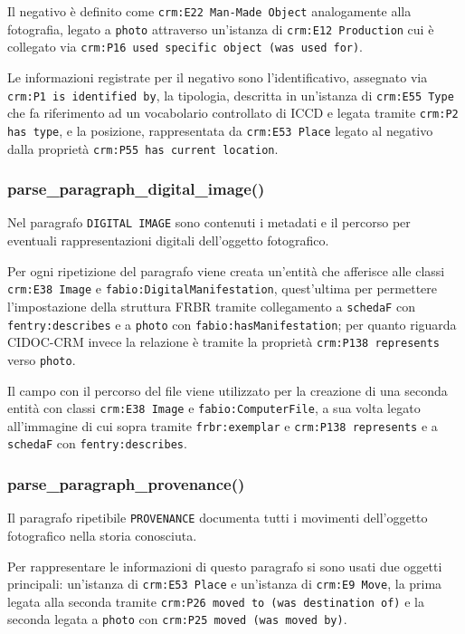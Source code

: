Il negativo è definito come \texttt{crm:E22 Man-Made Object} analogamente alla fotografia, legato a \texttt{photo} attraverso un'istanza di \texttt{crm:E12 Production} cui è collegato via \texttt{crm:P16 used specific object (was used for)}.

Le informazioni registrate per il negativo sono l'identificativo, assegnato via \texttt{crm:P1 is identified by}, la tipologia, descritta in un'istanza di \texttt{crm:E55 Type} che fa riferimento ad un vocabolario controllato di ICCD e legata tramite \texttt{crm:P2 has type}, e la posizione, rappresentata da \texttt{crm:E53 Place} legato al negativo dalla proprietà \texttt{crm:P55 has current location}.

\subsubsection{parse\_paragraph\_digital\_image()}
Nel paragrafo \texttt{DIGITAL IMAGE} sono contenuti i metadati e il percorso per eventuali rappresentazioni digitali dell'oggetto fotografico.

Per ogni ripetizione del paragrafo viene creata un'entità che afferisce alle classi \texttt{crm:E38 Image} e \texttt{fabio:DigitalManifestation}, quest'ultima per permettere l'impostazione della struttura FRBR tramite collegamento a \texttt{schedaF} con \texttt{fentry:describes} e a \texttt{photo} con \texttt{fabio:hasManifestation}; per quanto riguarda CIDOC-CRM invece la relazione è tramite la proprietà \texttt{crm:P138 represents} verso \texttt{photo}.

Il campo con il percorso del file viene utilizzato per la creazione di una seconda entità con classi \texttt{crm:E38 Image} e \texttt{fabio:ComputerFile}, a sua volta legato all'immagine di cui sopra tramite \texttt{frbr:exemplar} e \texttt{crm:P138 represents} e a \texttt{schedaF} con \texttt{fentry:describes}.

\subsubsection{parse\_paragraph\_provenance()}
Il paragrafo ripetibile \texttt{PROVENANCE} documenta tutti i movimenti dell'oggetto fotografico nella storia conosciuta.

Per rappresentare le informazioni di questo paragrafo si sono usati due oggetti principali: un'istanza di \texttt{crm:E53 Place} e un'istanza di \texttt{crm:E9 Move}, la prima legata alla seconda tramite \texttt{crm:P26 moved to (was destination of)} e la seconda legata a \texttt{photo} con \texttt{crm:P25 moved (was moved by)}.

